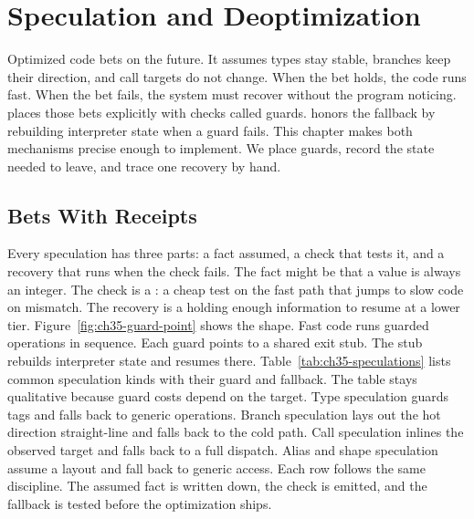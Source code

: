 \chapter{Speculation and Deoptimization}\label{ch:speculation-deoptimization}

Optimized code bets on the future.
It assumes types stay stable, branches keep their direction, and call targets do not change.
When the bet holds, the code runs fast.
When the bet fails, the system must recover without the program noticing.
 places those bets explicitly with checks called guards.
 honors the fallback by rebuilding interpreter state when a guard fails.
This chapter makes both mechanisms precise enough to implement.
We place guards, record the state needed to leave, and trace one recovery by hand.

\section{Bets With Receipts}\label{sec:ch35-bets}

Every speculation has three parts: a fact assumed, a check that tests it, and a recovery that runs when the check fails.
The fact might be that a value is always an integer.
The check is a : a cheap test on the fast path that jumps to slow code on mismatch.
The recovery is a  holding enough information to resume at a lower tier.
Figure~\ref{fig:ch35-guard-point} shows the shape.
Fast code runs guarded operations in sequence.
Each guard points to a shared exit stub.
The stub rebuilds interpreter state and resumes there.
Table~\ref{tab:ch35-speculations} lists common speculation kinds with their guard and fallback.
The table stays qualitative because guard costs depend on the target.
Type speculation guards tags and falls back to generic operations.
Branch speculation lays out the hot direction straight-line and falls back to the cold path.
Call speculation inlines the observed target and falls back to a full dispatch.
Alias and shape speculation assume a layout and fall back to generic access.
Each row follows the same discipline.
The assumed fact is written down, the check is emitted, and the fallback is tested before the optimization ships.

